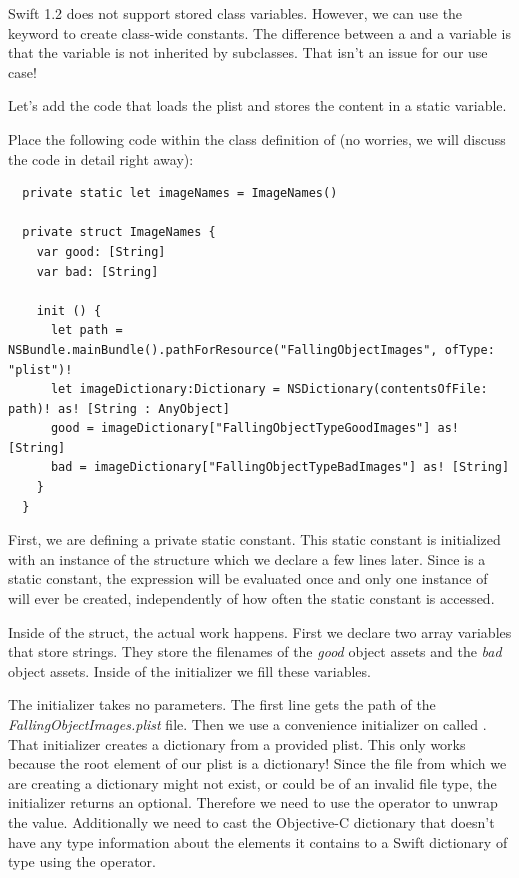 \begin{details}[frametitle={Class variables in Swift}] 
Swift 1.2 does not support stored class variables. However, we can use the
 keyword to create class-wide constants. The difference
between a  and a  variable is that the
 variable is not inherited by subclasses. That isn't an issue
for our use case!
\end{details}

Let's add the code that loads the plist and stores the content in a static
variable. 

\begin{leftbar}
Place the following code within the class definition of
 (no worries, we will discuss the code in detail right away):

\begin{lstlisting}
  private static let imageNames = ImageNames()

  private struct ImageNames {
    var good: [String]
    var bad: [String]
    
    init () {
      let path = NSBundle.mainBundle().pathForResource("FallingObjectImages", ofType: "plist")!
      let imageDictionary:Dictionary = NSDictionary(contentsOfFile: path)! as! [String : AnyObject]
      good = imageDictionary["FallingObjectTypeGoodImages"] as! [String]
      bad = imageDictionary["FallingObjectTypeBadImages"] as! [String]
    }
  }
\end{lstlisting}
\end{leftbar}

First, we are defining a private static constant. This static constant is
initialized with an instance of the structure  which we declare a few lines later. Since
 is a static constant, the expression will be
evaluated once and only one instance of  will ever be
created, independently of how often the static constant is accessed.

Inside of the  struct, the actual work happens. First we
declare two array variables that store strings. They store the filenames of the
\textit{good} object assets and the \textit{bad} object assets. Inside of the
initializer we fill these variables.

The initializer takes no parameters. The first line gets the path of the
\textit{FallingObjectImages.plist} file. Then we use a convenience initializer
on  called . That
initializer creates a dictionary from a provided plist. This only works because
the root element of our plist is a dictionary! Since the file from which we are
creating a dictionary might not exist, or could be of an invalid file type, the
 initializer returns an optional. Therefore we need
to use the \inlinecode{!} operator to unwrap the value. Additionally we need to
cast the Objective-C dictionary that doesn't have any type information about the
elements it contains to a Swift dictionary of type  using the  operator.

